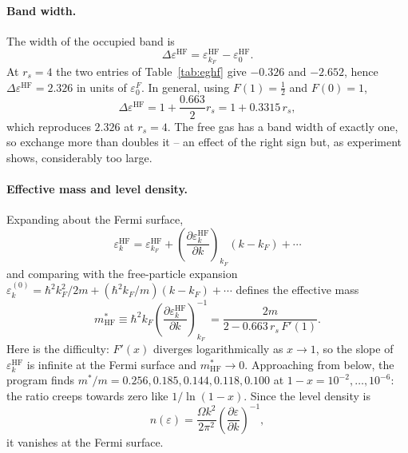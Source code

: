 \paragraph{Band width.}
The width of the occupied band is
\begin{equation}
  \Delta\varepsilon^{\mathrm{HF}}
   = \varepsilon_{k_F}^{\mathrm{HF}} - \varepsilon_{0}^{\mathrm{HF}} .
  \label{eq:6-bandwidth}
\end{equation}
At $r_s=4$ the two entries of Table~\ref{tab:eghf} give $-0.326$ and
$-2.652$, hence $\Delta\varepsilon^{\mathrm{HF}}=2.326$ in units of
$\varepsilon_0^{F}$.  In general, using $F(1)=\tfrac12$ and $F(0)=1$,
\begin{equation}
  \Delta\varepsilon^{\mathrm{HF}}
   = 1 + \frac{0.663}{2}r_s
   = 1 + 0.3315\,r_s ,
  \label{eq:6-bandwidthformula}
\end{equation}
which reproduces $2.326$ at $r_s=4$.  The free gas has a band width of exactly
one, so exchange more than doubles it -- an effect of the right sign but, as
experiment shows, considerably too large.

\paragraph{Effective mass and level density.}
Expanding about the Fermi surface,
\begin{equation}
  \varepsilon_k^{\mathrm{HF}} = \varepsilon_{k_F}^{\mathrm{HF}}
    + \left(\frac{\partial\varepsilon_k^{\mathrm{HF}}}
      {\partial k}\right)_{k_F}(k-k_F) + \cdots
  \label{eq:6-taylor}
\end{equation}
and comparing with the free-particle expansion
$\varepsilon_k^{(0)}=\hbar^2k_F^2/2m+(\hbar^2k_F/m)(k-k_F)+\cdots$ defines the
effective mass
\begin{equation}
  m^{*}_{\mathrm{HF}}
   \equiv \hbar^2k_F\left(
     \frac{\partial\varepsilon_k^{\mathrm{HF}}}{\partial k}
   \right)^{-1}_{k_F}
   = \frac{2m}{2-0.663\,r_s\,F'(1)} .
  \label{eq:6-effectivemass}
\end{equation}
Here is the difficulty: $F'(x)$ diverges logarithmically as $x\to1$, so the
slope of $\varepsilon^{\mathrm{HF}}_k$ is infinite at the Fermi surface and
$m^{*}_{\mathrm{HF}}\to0$.  Approaching from below, the program finds
$m^{*}/m = 0.256, 0.185, 0.144, 0.118, 0.100$ at
$1-x=10^{-2},\dots,10^{-6}$: the ratio creeps towards zero like
$1/\ln(1-x)$.  Since the level density is
\begin{equation}
  n(\varepsilon) = \frac{\Omega k^2}{2\pi^2}
    \left(\frac{\partial\varepsilon}{\partial k}\right)^{-1},
  \label{eq:6-leveldensity}
\end{equation}
it vanishes at the Fermi surface.

